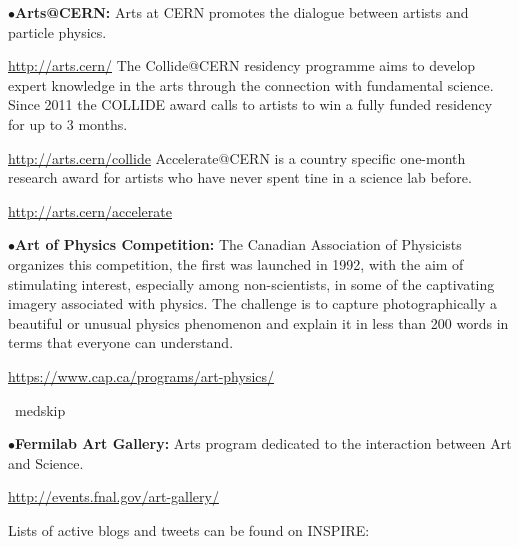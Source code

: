 \medskip
\medskip





\medskip

\item{$\bullet$}{\bf Arts@CERN:} 
Arts at CERN promotes the dialogue between artists and particle physics.
	\item{}\qquad\url{http://arts.cern/}
The Collide@CERN residency programme aims to develop expert knowledge in the arts through the connection with fundamental science. Since 2011 the COLLIDE award calls to artists to win a fully funded residency for up to 3 months.
	\item{}\qquad\url{http://arts.cern/collide}
Accelerate@CERN is a country specific one-month research award for artists who have never spent tine in a science lab before.
	\item{}\qquad\url{http://arts.cern/accelerate}


\medskip

\item{$\bullet$}{\bf Art of Physics Competition:}
The Canadian Association of Physicists organizes this competition, the first was launched in 1992, with the aim of stimulating interest, especially among non-scientists, in some of the captivating imagery associated with physics. The challenge is to capture photographically a beautiful or unusual physics phenomenon and explain it in less than 200 words in terms that everyone can understand.
	\item{}\qquad\url{https://www.cap.ca/programs/art-physics/}

\ medskip

\item{$\bullet$}{\bf Fermilab Art Gallery:}
Arts program dedicated to the interaction between Art and Science.
	\item{}\qquad\url{http://events.fnal.gov/art-gallery/}


\medskip


\medskip

Lists of active blogs and tweets can be found on INSPIRE:

